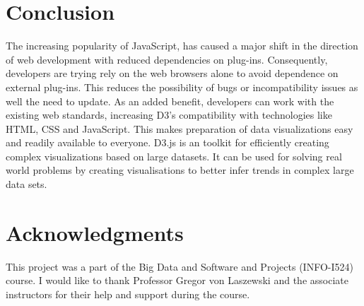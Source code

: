 \documentclass[9pt,twocolumn,twoside]{../../styles/osajnl}
\begin{document}
\section{Conclusion}
The increasing popularity of JavaScript, has caused a major shift in the direction of web development with reduced dependencies on plug-ins. Consequently, developers are trying rely on the web browsers alone to avoid dependence on external plug-ins. This reduces the possibility of bugs or incompatibility issues as well the need to update. As an added benefit, developers can work with the existing web standards, increasing D3’s compatibility with technologies like HTML, CSS and JavaScript. This makes preparation of data visualizations easy and readily available to everyone. D3.js is an toolkit for efficiently creating complex visualizations based on large datasets. It can be used for solving real world problems by creating visualisations to better infer trends in complex large data sets.

\section{Acknowledgments}
This project was a part of the Big Data and Software and Projects (INFO-I524) course. I would like to thank Professor Gregor von Laszewski and the associate instructors for their help and support during the course. 


\end{document}
